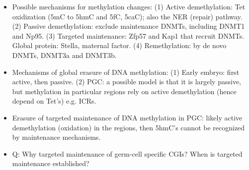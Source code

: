 \documentclass{report}
\begin{document}
\begin{itemize}
	\item Possible mechanisms for methylation changes: (1) Active demethylation: Tet oxidization (5mC to 5hmC and 5fC, 5caC); also the NER (repair) pathway. (2) Passive demethylation: exclude maintenance DNMTs, including DNMT1 and Np95. (3) Targeted maintenance: Zfp57 and Kap1 that recruit DNMTs. Global protein: Stella, maternal factor. (4) Remethylation: by de novo DNMTs, DNMT3a and DNMT3b.  
	
	\item Mechanisms of global erasure of DNA methylation: (1) Early embryo: first active, then passive. (2) PGC: a possible model is that it is largely passive, but methylation in particular regions rely on active demethylation (hence depend on Tet’s) e.g. ICRs. 
	
	\item Erasure of targeted maintenance of DNA methylation in PGC: likely active demethylation (oxidation) in the regions, then 5hmC’s cannot be recognized by maintenance mechanisms.
	
	\item Q: Why targeted maintenance of germ-cell specific CGIs? When is targeted maintenance established?  
\end{itemize}
\end{document}
